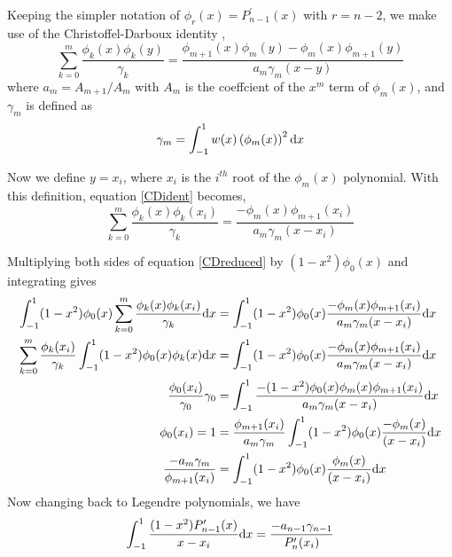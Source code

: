 \documentclass[preprint]{revtex4}
\newcommand{\dx}{{\rm d}x}
\newcommand{\intunit}{\ensuremath{\int_{-1}^{1}}}
\begin{document}
Keeping the simpler notation of $\phi_r(x)=P_{n-1}^\prime(x)$ with $r=n-2$, we make
use of the Christoffel-Darboux identity \cite{Hildebrand}, 
\begin{equation}
\label{CDident}
\sum_{k=0}^{m}\frac{\phi_k(x)\phi_k(y)}{\gamma_k}=\frac{\phi_{m+1}(x)\phi_m(y)-\phi_m(x)\phi_{m+1}(y)}{a_m\gamma_m(x-y)}
\end{equation}
where $a_m=A_{m+1}/A_m$ with $A_m$ is the coeffcient of the $x^m$ term of $\phi_m(x)$, and $\gamma_m$ 
is defined as \
\begin{equation}
\label{gammadef}
\gamma_m=\intunit w(x)\left(\phi_m(x)\right)^2\dx
\end{equation}

Now we define $y=x_i$, where $x_i$ is the $i^{th}$ root of the $\phi_m(x)$ polynomial. 
With this definition, equation \ref{CDident} becomes, 
\begin{equation}
\label{CDreduced}
\sum_{k=0}^{m}\frac{\phi_k(x)\phi_k(x_i)}{\gamma_k}=\frac{-\phi_m(x)\phi_{m+1}(x_i)}{a_m\gamma_m(x-x_i)}
\end{equation}

Multiplying both sides of equation \ref{CDreduced} by $(1-x^2)\phi_0(x)$ and integrating gives
\begin{align}
\intunit (1-x^2)\phi_0(x)\sum_{k=0}^{m}\frac{\phi_k(x)\phi_k(x_i)}{\gamma_k}\dx &= \intunit (1-x^2)\phi_0(x)\frac{-\phi_m(x)\phi_{m+1}(x_i)}{a_m\gamma_m(x-x_i)}\dx \nonumber \\
\sum_{k=0}^{m}\frac{\phi_k(x_i)}{\gamma_k}\intunit (1-x^2)\phi_0(x)\phi_k(x)\dx &= \intunit (1-x^2)\phi_0(x)\frac{-\phi_m(x)\phi_{m+1}(x_i)}{a_m\gamma_m(x-x_i)}\dx \nonumber \\
\frac{\phi_0(x_i)}{\gamma_0}\gamma_0 &= \intunit \frac{-(1-x^2)\phi_0(x)\phi_m(x)\phi_{m+1}(x_i)}{a_m\gamma_m(x-x_i)}\dx \nonumber \\
\phi_0(x_i)=1 &= \frac{\phi_{m+1}(x_i)}{a_m\gamma_m}\intunit (1-x^2)\phi_0(x)\frac{-\phi_m(x)}{(x-x_i)}\dx \nonumber \\
\label{CDseq}
\frac{-a_m\gamma_m}{\phi_{m+1}(x_i)} &= \intunit (1-x^2)\phi_0(x)\frac{\phi_m(x)}{(x-x_i)}\dx 
\end{align}
Now changing back to Legendre polynomials, we have
\begin{equation}
\label{CDPend}
\intunit \frac{(1-x^2)P_{n-1}^\prime(x)}{x-x_i}\dx = \frac{-a_{n-1}\gamma_{n-1}}{P_n^\prime(x_i)}
\end{equation}
\end{document}
